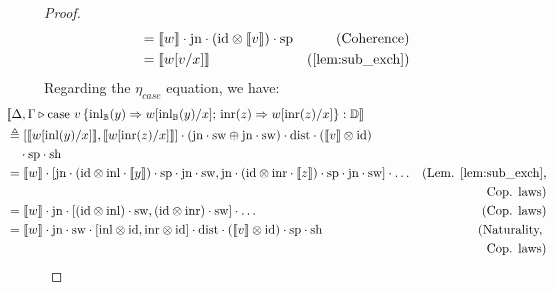 \begin{proof}
\begin{align*}
    &\hspace{-30pt}  = \llbracket w \rrbracket \comp \text{jn} \comp( \id \otimes \llbracket v \rrbracket) \comp \text{sp} & {\text{(Coherence)}}\\
    & \hspace{-30pt}  = \llbracket w[v/x]  \rrbracket  & {\text{(\autoref{lem:sub_exch})}}
    \end{align*}
  Regarding the $\eta_{case}$ equation, we have:
\begin{align*}
  &  \hspace{-30pt} \llbracket \Delta,\Gamma \vljud \text{case } v\, \{\text{inl}_{\typeB} (y) \Rightarrow w [ \text{inl}_{\typeB}(y)/x] ;\, \text{inr} (z) \Rightarrow w [ \text{inr}(z)/x]\}: \typeD\rrbracket \\
  &  \hspace{-30pt} \triangleq  [\llbracket  w [ \text{inl}(y)/x] \rrbracket, \llbracket  w [ \text{inr}(z)/x] \rrbracket] \comp (\text{jn} \comp \sw \oplus \text{jn} \comp \sw  ) \comp \dist \comp (\llbracket v\rrbracket \otimes \id) \\
  &  \hspace{-20pt} \comp  \text{sp} \comp \text{sh}  \\
  &  \hspace{-30pt} = \llbracket w \rrbracket \comp [\text{jn} \comp (\id \otimes\inl \comp  \llbracket y \rrbracket) \comp \text{sp} \comp \text{jn} \comp \sw , 
   \text{jn}\comp (\id \otimes\inr  \comp \llbracket z \rrbracket)  \comp \text{sp} \comp \text{jn} \comp \sw  ] \comp \ldots  & {\text{(Lem. \ref{lem:sub_exch},}} \\
  &  & {\text{Cop. laws)}}  \\
  &  \hspace{-30pt} =  \llbracket w \rrbracket \comp \text{jn} \comp [ (\id \otimes\inl)  \comp \sw  ,   (\id \otimes\inr) \comp \sw  ] \comp \ldots  & {\text{(Cop. laws})}   \\
  &  \hspace{-30pt} = \llbracket w \rrbracket \comp \text{jn} \comp   \sw \comp  [\inl \otimes \id , \inr \otimes \id] \comp \dist   \comp (\llbracket v \rrbracket \otimes \id)  \comp  \text{sp}\comp \text{sh}  & {\text{(Naturality, }}  \\
  &  \hspace{-30pt} \hspace{10pt} & {\text{Cop. laws})}   \\

\end{align*}
\end{proof}
